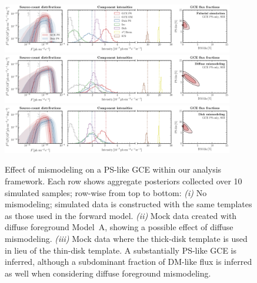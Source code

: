 \documentclass[prd,aps,10pt,nofootinbib,twocolumn,superscriptaddress,preprintnumbers,balancelastpage,longbibliography,floatfix]{revtex4-2}
\begin{document}
%
\begin{figure}[!htbp]
\centering
\includegraphics[width=0.9\textwidth]{plots/sim_sbi_ps_agg.pdf}
\includegraphics[width=0.9\textwidth]{plots/sim_sbi_modelA_ps.pdf}
\includegraphics[width=0.9\textwidth]{plots/sim_sbi_thick_disk_mm_ps.pdf}
\caption{Effect of mismodeling on a PS-like GCE within our analysis framework. Each row shows aggregate posteriors collected over 10 simulated samples; row-wise from top to bottom: \emph{(i)} No mismodeling; simulated data is constructed with the same templates as those used in the forward model. \emph{(ii)} Mock data created with diffuse foreground {Model~A}, showing a possible effect of diffuse mismodeling. \emph{(iii)} Mock data where the thick-disk template is used in lieu of the thin-disk template. A substantially PS-like GCE is inferred, although a subdominant fraction of DM-like flux is inferred as well when considering diffuse foreground mismodeling.}
\label{fig:sim_sbi_mismo_ps}
\end{figure}
%
\end{document}
